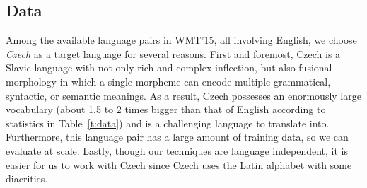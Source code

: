 \documentclass[11pt]{article}
\newcommand{\bi}[1]{\textbf{\textit{#1}}}
\begin{document}
\subsection{Data}
Among the available language pairs in WMT'15, all involving English, 
we choose {\it Czech} as a target language for several reasons. First and
foremost, Czech is a Slavic language with not only rich
and complex inflection,
but also fusional morphology in which a single morpheme can encode multiple
grammatical, syntactic, or semantic meanings. As a result, Czech possesses an enormously large
vocabulary (about 1.5 to 2 times bigger than that of English according to 
statistics in Table~\ref{t:data}) and is a challenging language to translate
into. Furthermore, this language pair has a large
amount of training data, so %
we can evaluate at scale. Lastly, though our techniques are language
independent, it is easier for us to work with Czech since Czech uses the Latin alphabet with some
diacritics. %

\begin{table} %
\centering
{}
\caption{{\bf WMT'15 English-Czech data} -- shown are various statistics of our training
data such as {\it sentence}, {\it token} (word and character counts), as well as
{\it type} (sizes of the word and character vocabularies).
We show in addition the amount of words in a vocabulary expressed by a list of 200 characters found
in frequent words.}
\label{t:data}
\end{table}
\end{document}
